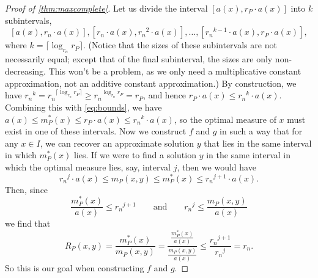 \documentclass[]{article}
\newcommand{\ceil}[1]{\lceil{#1}\rceil}
\begin{document}
\begin{proof}[Proof of \autoref{thm:maxcomplete}]
  Let us divide the interval $[a(x), r_P \cdot a(x)]$ into $k$ subintervals,
  \begin{displaymath}
    \left[a(x), r_n \cdot a(x)\right], \left[r_n \cdot a(x), {r_n}^2 \cdot a(x)\right], \ldots, \left[{r_n}^{k - 1} \cdot a(x), r_P \cdot a(x)\right],
  \end{displaymath}
  where $k = \ceil{\log_{r_n}{r_P}}$.
  (Notice that the sizes of these subintervals are not necessarily equal; except that of the final subinterval, the sizes are only non-decreasing.
  This won't be a problem, as we only need a multiplicative constant approximation, not an additive constant approximation.)
  By construction, we have ${r_n}^k = {r_n}^{\ceil{\log_{r_n}{r_P}}} \geq {r_n}^{\log_{r_n}{r_P}} = r_P$, and hence $r_P \cdot a(x) \leq {r_n}^k \cdot a(x)$.
  Combining this with \autoref{eq:bounds}, we have $a(x) \leq m^*_P(x) \leq r_P \cdot a(x) \leq {r_n}^k \cdot a(x)$, so the optimal measure of $x$ must exist in one of these intervals.
  Now we construct $f$ and $g$ in such a way that for any $x \in I$, we can recover an approximate solution $y$ that lies in the same interval in which $m_P^*(x)$ lies.
  If we were to find a solution $y$ in the same interval in which the optimal measure lies, say, interval $j$, then we would have
  \begin{equation}\label{eq:subinterval}
    {r_n}^j \cdot a(x) \leq m_P(x, y) \leq m^*_P(x) \leq {r_n}^{j + 1} \cdot a(x).
  \end{equation}
  Then, since
  \begin{equation*}
    \frac{m^*_P(x)}{a(x)} \leq {r_n}^{j + 1} \qquad \text{and} \qquad {r_n}^j \leq \frac{m_P(x, y)}{a(x)}
  \end{equation*}
  we find that
  \begin{equation}\label{eq:result}
    R_P(x, y) = \frac{m_P^*(x)}{m_P(x, y)} = \frac{\frac{m^*_P(x)}{a(x)}}{\frac{m_P(x, y)}{a(x)}} \leq \frac{{r_n}^{j + 1}}{{r_n}^j} = r_n.
  \end{equation}
  So this is our goal when constructing $f$ and $g$.


\end{proof}
\end{document}
